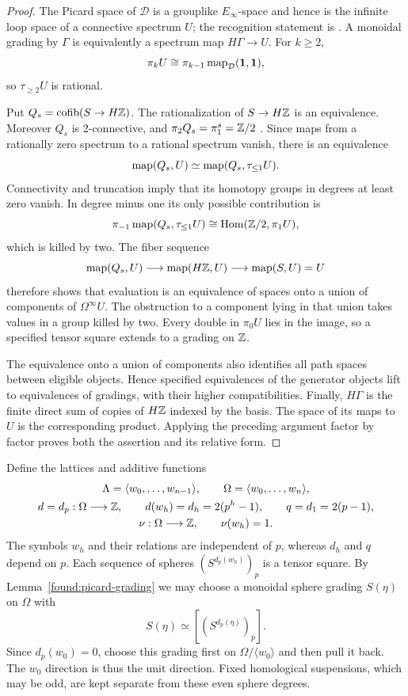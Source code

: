 \begin{proof}
The Picard space of $\mathcal D$ is a grouplike $E_\infty$-space and
hence is the infinite loop space of a connective spectrum $U$;
the recognition statement is
\cite[Remark~5.2.6.26]{LurieHA}.  A monoidal grading by $\Gamma$ is
equivalently a spectrum map $H\Gamma\to U$.  For $k\geq2$,
\[
 \pi_k U\cong\pi_{k-1}\operatorname{map}_{\mathcal D}(\mathbf 1,\mathbf 1),
\]
so $\tau_{\geq2}U$ is rational.

Put $Q_s=\operatorname{cofib}(S\to H\mathbb Z)$.  The rationalization of $S\to H\mathbb Z$
is an equivalence.  Moreover $Q_s$ is 2-connective, and
$\pi_2 Q_s=\pi_1^s=\mathbb Z/2$
\cite[Corollaries~4J.3--4J.4]{Hatcher2002}. Since maps from a rationally zero spectrum
to a rational spectrum vanish, there is an equivalence
\[
 \operatorname{map}(Q_s,U)\simeq\operatorname{map}(Q_s,\tau_{\leq1}U).
\]
Connectivity and truncation imply that its homotopy groups in degrees
at least zero vanish.  In degree minus one its only possible
contribution is
\[
 \pi_{-1}\operatorname{map}(Q_s,\tau_{\leq1}U)
   \cong\operatorname{Hom}(\mathbb Z/2,\pi_1 U),
\]
which is killed by two.  The fiber sequence
\[
 \operatorname{map}(Q_s,U)\longrightarrow\operatorname{map}(H\mathbb Z,U)
                    \longrightarrow\operatorname{map}(S,U)=U
\]
therefore shows that evaluation is an equivalence of spaces onto a
union of components of $\Omega^\infty U$.  The obstruction to a
component lying in that union takes values in a group killed by two.
Every double in $\pi_0 U$ lies in the image, so a specified tensor
square extends to a grading on $\mathbb Z$.

The equivalence onto a union of components also identifies all path
spaces between eligible objects.  Hence specified equivalences of
the generator objects lift to equivalences of gradings, with their
higher compatibilities.  Finally, $H\Gamma$ is the finite direct sum
of copies of $H\mathbb Z$ indexed by the basis.  The space of its maps to
$U$ is the corresponding product.  Applying the preceding argument
factor by factor proves both the assertion and its relative form.
\end{proof}

Define the lattices and additive functions
\begin{equation}\label{eq:found-weights}
 \begin{gathered}
  \Lambda=\langle w_0,\ldots,w_{n-1}\rangle,\qquad
  \Omega=\langle w_0,\ldots,w_n\rangle,\\
  d=d_p:\Omega\longrightarrow\mathbb Z,\qquad
  d(w_h)=d_h=2(p^h-1),\qquad q=d_1=2(p-1),\\
  \nu:\Omega\longrightarrow\mathbb Z,\qquad \nu(w_h)=1.
 \end{gathered}
\end{equation}
The symbols $w_h$ and their relations are independent of $p$, whereas
$d_h$ and $q$ depend on $p$.  Each sequence of spheres
$(S^{d_p(w_h)})_p$ is a tensor square.  By
Lemma~\ref{found:picard-grading} we may choose a monoidal sphere
grading $S(\eta)$ on $\Omega$ with
\[
 S(\eta)\simeq[(S^{d_p(\eta)})_p].
\]
Since $d_p(w_0)=0$, choose this grading first on
$\Omega/\langle w_0\rangle$ and then pull it back.  The $w_0$
direction is thus the unit direction.  Fixed homological suspensions,
which may be odd, are kept separate from these even sphere degrees.

